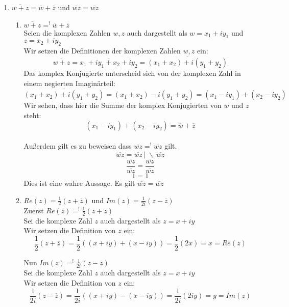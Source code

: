 \documentclass{article}
\begin{document}
    \begin{enumerate}[ label = (\alph*) ]
        \item \( \overline{ w+z} = \overline{w} + \overline{z} \) und \( \overline{wz} = \overline{wz} \) \\
        \begin{enumerate}

            \item \( \overline{ w+z} =^! \overline{w} + \overline{z} \) \\
            Seien die komplexen Zahlen \(w, z\) auch dargestellt als \(w = x_1 + iy_1 \) und \(z = x_2 + iy_2 \) \\
            Wir setzen die Definitionen der komplexen Zahlen \(w, z\) ein:
            \[ \overline{ w+z} = \overline{ x_1 + iy_1 + x_2 + iy_2} = \overline{ (x_1 + x_2) + i (y_1 + y_2) } \]
            Das komplex Konjugierte unterscheid sich von der komplexen Zahl in einem negierten Imaginärteil:
            \[ \overline{ (x_1 + x_2) + i (y_1 + y_2) } = (x_1 + x_2) - i (y_1 + y_2) = (x_1 - iy_1) + (x_2 -iy_2) \]
            Wir sehen, dass hier die Summe der komplex Konjugierten von \(w\) und \(z\) steht:
            \[ (x_1 - iy_1) + (x_2 -iy_2) = \overline{w} + \overline{z} \] \\

            Außerdem gilt es zu beweisen dass \( \overline{wz} =^! \overline{wz} \) gilt. \\
            \[ \overline{wz} = \overline{wz} \ | \ \backslash \ \overline{wz}\]
            \[ \frac{\overline{wz}}{\overline{wz}} = \frac{\overline{wz}}{\overline{wz}}\]
            \[ 1 = 1\]
            Dies ist eine wahre Aussage. Es gilt \( \overline{wz} = \overline{wz} \)
        
            \item \( Re(z) = \frac{1}{2} ( z + \overline{z} ) \) und \( Im(z) = \frac{1}{2i} ( z - \overline{z} ) \) \\
            Zuerst \( Re(z) =^! \frac{1}{2} ( z + \overline{z} ) \) \\
            Sei die komplexe Zahl \(z\) auch dargestellt als \(z = x + iy \) \\
            Wir setzen die Definition von \(z\) ein:
            \[ \frac{1}{2} ( z + \overline{z} ) = \frac{1}{2} ( (x + iy) + (x -iy))  = \frac{1}{2} (2x) = x = Re(z) \]

            Nun \( Im(z) =^! \frac{1}{2i} ( z - \overline{z} ) \) \\
            Sei die komplexe Zahl \(z\) auch dargestellt als \(z = x + iy \) \\
            Wir setzen die Definition von \(z\) ein:
            \[ \frac{1}{2i} ( z - \overline{z} ) = \frac{1}{2i} ( (x + iy) - (x -iy))  = \frac{1}{2i} (2iy) = y = Im(z) \]


\end{enumerate}
\end{enumerate}
\end{document}
